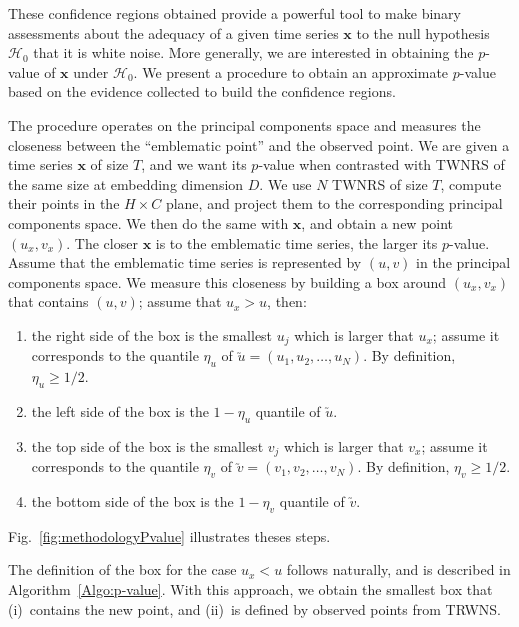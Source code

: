 \documentclass[alpha-refs]{wiley-article}
\begin{document}

These confidence regions obtained provide a powerful tool to make binary assessments about the adequacy of a given time series $\bm x$ to the null hypothesis $\mathcal H_0$ that it is white noise.
More generally, we are interested in obtaining the $p$-value of $\bm x$ under $\mathcal H_0$.
We present a procedure to obtain an approximate $p$-value based on the evidence collected to build the confidence regions.

The procedure operates on the principal components space and measures the closeness between the ``emblematic point'' and the observed point.
We are given a time series $\bm x$ of size $T$, and we want its $p$-value when contrasted with TWNRS of the same size at embedding dimension $D$.
We use $N$ TWNRS of size $T$, compute their points in the $H\times C$ plane, and project them to the corresponding principal components space.
We then do the same with $\bm x$, and obtain a new point $(u_x,v_x)$.
The closer $\bm x$ is to the emblematic time series, the larger its $p$-value.
Assume that the emblematic time series is represented by $(u,v)$ in the principal components space.
We measure this closeness by building a box around $(u_x,v_x)$ that contains $(u,v)$; assume that $u_x>u$, then:
\begin{enumerate}
	\item the right side of the box is the smallest $u_j$ which is larger that $u_x$; assume it corresponds to the quantile $\eta_u$ of $\utilde u = (u_1,u_2,\dots, u_N)$. By definition, $\eta_u\geq 1/2$.
	\item the left side of the box is the $1-\eta_u$ quantile of $\utilde u$.
	\item the top side of the box is the smallest $v_j$ which is larger that $v_x$; assume it corresponds to the quantile $\eta_v$ of $\utilde v = (v_1,v_2,\dots, v_N)$. By definition, $\eta_v\geq 1/2$.
	\item the bottom side of the box is the $1-\eta_v$ quantile of $\utilde v$.
\end{enumerate}
Fig.~\ref{fig:methodologyPvalue} illustrates theses steps.

The definition of the box for the case $u_x<u$ follows naturally, and is described in Algorithm~\ref{Algo:p-value}.
With this approach, we obtain the smallest box that (i)~contains the new point, and (ii)~is defined by observed points from TRWNS.
\end{document}
